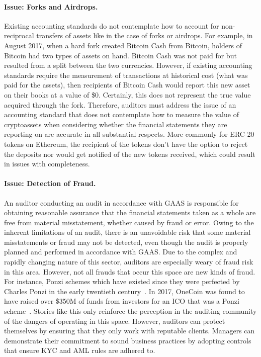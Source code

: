 \paragraph{Issue: Forks and Airdrops.} Existing accounting standards do not contemplate how to account for non-reciprocal transfers of assets like in the case of forks or airdrops. For example, in August 2017, when a hard fork created Bitcoin Cash from Bitcoin, holders of Bitcoin had two types of assets on hand. Bitcoin Cash was not paid for but resulted from a split between the two currencies. However, if existing accounting standards require the measurement of transactions at historical cost (what was paid for the assets), then recipients of Bitcoin Cash would report this new asset on their books at a value of \$0. Certainly, this does not represent the true value acquired through the fork. Therefore, auditors must address the issue of an accounting standard that does not contemplate how to measure the value of cryptoassets when considering whether the financial statements they are reporting on are accurate in all substantial respects. More commonly for ERC-20 tokens on Ethereum, the recipient of the tokens don{'}t have the option to reject the deposits nor would get notified of the new tokens received, which could result in issues with completeness. 

\paragraph{Issue: Detection of Fraud.} An auditor conducting an audit in accordance with GAAS is responsible for obtaining reasonable assurance that the financial statements taken as a whole are free from material misstatement, whether caused by fraud or error. Owing to the inherent limitations of an audit, there is an unavoidable risk that some material misstatements or fraud may not be detected, even though the audit is properly planned and performed in accordance with GAAS. Due to the complex and rapidly changing nature of this sector, auditors are especially weary of fraud risk in this area. 
However, not all frauds that occur this space are new kinds of fraud. For instance, Ponzi schemes which have existed since they were perfected by Charles Ponzi in the early twentieth century~\cite{ponzi2001rise}. In 2017, OneCoin was found to have raised over \$350M of funds from investors for an ICO that was a Ponzi scheme~\cite{atlanticCryptoPonzi2017}. Stories like this only reinforce the perception in the auditing community of the dangers of operating in this space. However, auditors can protect themselves by ensuring that they only work with reputable clients. Managers can demonstrate their commitment to sound business practices by adopting controls that ensure KYC and AML rules are adhered to.

